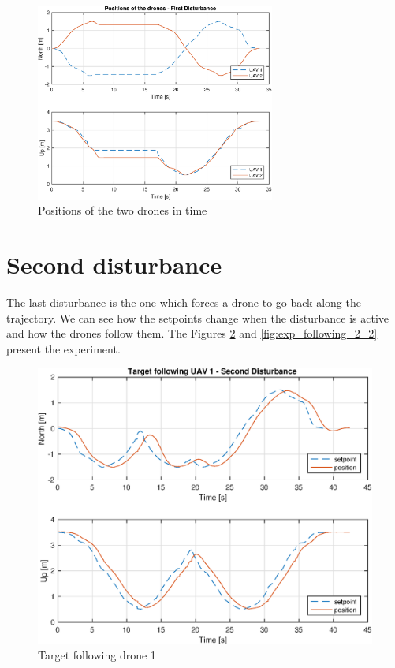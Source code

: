 \begin{figure}
\centering
\includegraphics[width=0.7\textwidth]{chapters/chapter-05/figures/overlapped_1.eps}
\caption{Positions of the two drones in time}
\label{fig:exp_overlapped_1}
\end{figure}

\section{Second disturbance}
The last disturbance is the one which forces a drone to go back along the
trajectory. We can see how the setpoints change when the disturbance is active
and how the drones follow them. The Figures \ref{fig:exp_following_1_2}
and \ref{fig:exp_following_2_2} present the experiment.

\begin{figure}
\centering
\includegraphics[width=0.7\linewidth]{chapters/chapter-05/figures/following_1_2.eps}
\caption{Target following drone 1}
\label{fig:exp_following_1_2}
\end{figure}

